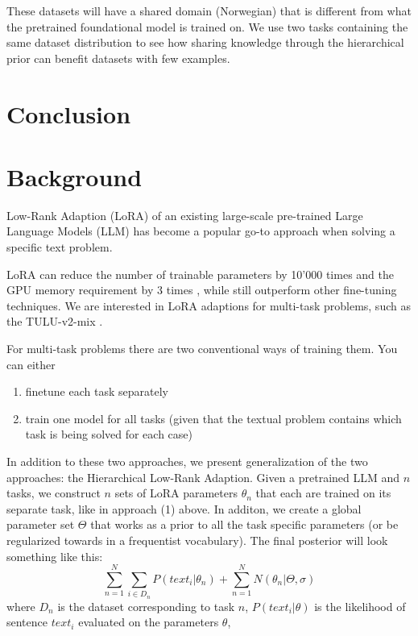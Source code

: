 \documentclass{article}
\begin{document}
These datasets will have a shared domain (Norwegian) that is different from what the pretrained foundational model is trained on.
We use two tasks containing the same dataset distribution to see how sharing knowledge through the hierarchical prior can benefit datasets with few examples.


\section{Conclusion}





\section*{Background}
Low-Rank  Adaption (LoRA) of an existing large-scale pre-trained Large Language Models (LLM) \cite{hu_lora_2021} has become a popular go-to approach when solving a specific text problem.

LoRA can reduce the number of trainable parameters by 10'000 times and the GPU memory requirement by 3 times \cite{hu_lora_2021}, while still outperform other fine-tuning techniques.
We are interested in LoRA adaptions for multi-task problems, such as the TULU-v2-mix \cite{ivison_camels_2023}.

For multi-task problems there are two conventional ways of training them. You can either 
\begin{enumerate}
    \item finetune each task separately
    \item train one model for all tasks (given that the textual problem contains which task is being solved for each case)
\end{enumerate}

In addition to these two approaches, we present generalization of the two approaches: the Hierarchical Low-Rank Adaption.
Given a pretrained LLM and $n$ tasks, we construct $n$ sets of LoRA parameters $\theta_n$ that each are trained on its separate task, like in approach (1) above. In additon, we create a global parameter set $\Theta$ that works as a prior to all the task specific parameters (or be regularized towards in a frequentist vocabulary).
The final posterior will look something like this:
%
\begin{equation} \label{eq:posterior}
    \sum_{n=1}^N  \sum_{i \in D_n} P(text_i | \theta_n) + \sum_{n=1}^N N(\theta_n | \Theta, \sigma)
\end{equation}
%
where
$D_n$ is the dataset corresponding to task $n$,
$P(text_i | \theta)$ is the likelihood of sentence $text_i$ evaluated on the parameters $\theta$,
\end{document}
